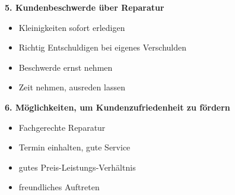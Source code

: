 \textbf{5. Kundenbeschwerde über Reparatur}

\begin{itemize}
\item
  Kleinigkeiten sofort erledigen
\item
  Richtig Entschuldigen bei eigenes Verschulden
\item
  Beschwerde ernst nehmen
\item
  Zeit nehmen, ausreden lassen
\end{itemize}

\textbf{6. Möglichkeiten, um Kundenzufriedenheit zu fördern}

\begin{itemize}
\item
  Fachgerechte Reparatur
\item
  Termin einhalten, gute Service
\item
  gutes Preis-Leistungs-Verhältnis
\item
  freundliches Auftreten
\end{itemize}
